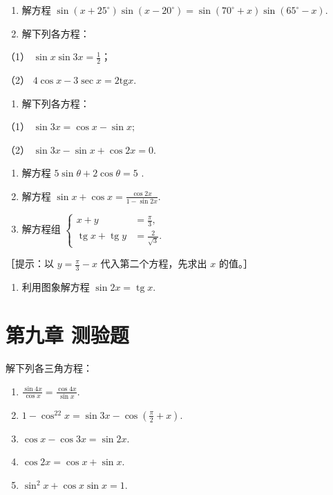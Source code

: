 \begin{enumerate}[start=2]
\item
  解方程
  \(\sin (x + 25^{\circ})\sin (x - 20^{\circ}) = \sin (70^{\circ} + x)\sin (65^{\circ} - x)\).
\item
  解下列各方程：
\end{enumerate}

（1） \(\sin x\sin 3x = \frac{1}{2}\)；

（2） \(4\cos x - 3\sec x = 2\mathrm{tg}x.\)

\begin{enumerate}[start=4]
\item
  解下列各方程：
\end{enumerate}

（1） \(\sin 3x = \cos x - \sin x;\)

（2） \(\sin 3x - \sin x + \cos 2x = 0.\)

\begin{enumerate}[start=5]
\item
  解方程 \(5\sin\theta + 2\cos\theta = 5\) .
\item
  解方程 \(\sin x + \cos x = \frac{\cos 2x}{1 - \sin 2x}\).
\item
  解方程组
  \(\left\{\begin{aligned}x+y&=\frac{\pi}{3},\\ \operatorname{tg}x+\operatorname{tg}y&=\frac{2}{\sqrt{3}}.\end{aligned}\right.\)
\end{enumerate}

［提示：以 \(y = \frac{\pi}{3} - x\) 代入第二个方程，先求出 \(x\)
的值。］

\begin{enumerate}[start=8]
\item
  利用图象解方程 \(\sin 2x = \operatorname{tg} x\).
\end{enumerate}

\section{第九章 测验题}

解下列各三角方程：

\begin{enumerate}
\item
  \(\frac{\sin 4x}{\cos x} = \frac{\cos 4x}{\sin x}\).
\item
  \(1 - \cos^22x = \sin 3x - \cos \left(\frac{\pi}{2} + x\right)\).
\item
  \(\cos x - \cos 3x = \sin 2x.\)
\item
  \(\cos 2x = \cos x + \sin x.\)
\item
  \(\sin^2 x + \cos x \sin x = 1\).
\end{enumerate}

